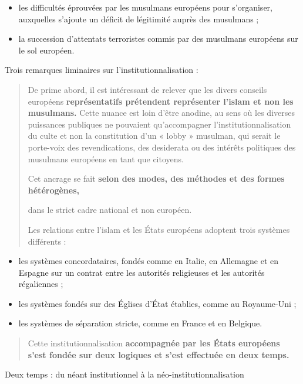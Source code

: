 \begin{itemize}
\item
  les difficultés éprouvées par les musulmans européens pour
  s'organiser, auxquelles s'ajoute un déficit de légitimité auprès des
  musulmans ;
\item
  la succession d'attentats terroristes commis par des musulmans
  européens sur le sol européen.
\end{itemize}

Trois remarques liminaires sur l'institutionnalisation :

\begin{quote}
De prime abord, il est intéressant de relever que les divers conseils
européens \textbf{représentatifs prétendent représenter l'islam et non
les musulmans.} Cette nuance est loin d'être anodine, au sens où les
diverses puissances publiques ne pouvaient qu'accompagner
l'institutionnalisation du culte et non la constitution d'un « lobby »
musulman, qui serait le porte-voix des revendications, des desiderata ou
des intérêts politiques des musulmans européens en tant que citoyens.

Cet ancrage se fait \textbf{selon des modes, des méthodes et des formes
hétérogènes,}

dans le strict cadre national et non européen.

Les relations entre l'islam et les États européens adoptent trois
systèmes différents :
\end{quote}

\begin{itemize}
\item
  les systèmes concordataires, fondés comme en Italie, en Allemagne et
  en Espagne sur un contrat entre les autorités religieuses et les
  autorités régaliennes ;
\item
  les systèmes fondés sur des Églises d'État établies, comme au
  Royaume-Uni ;
\item
  les systèmes de séparation stricte, comme en France et en Belgique.
\end{itemize}

\begin{quote}
Cette institutionnalisation \textbf{accompagnée par les États européens
s'est fondée sur deux logiques et s'est effectuée en deux temps.}


\end{quote}

Deux temps : du néant institutionnel à la néo-institutionnalisation

